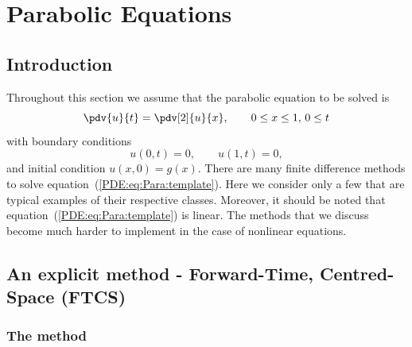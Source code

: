 \section{Parabolic Equations}

\subsection{Introduction}

Throughout this section we assume that the parabolic equation to be
solved is
%
\begin{equation}
  \pdv{u}{t} = \pdv[2]{u}{x} , \qquad 0 \le x \le 1, \, 0 \le t
  \label{PDE:eq:Para:template}
\end{equation}
%
with boundary conditions
%
\begin{equation*}
  u(0,t) = 0, \qquad u(1,t) = 0,
\end{equation*}
%
and initial condition $u(x,0) = g(x)$.  There are many finite
difference methods to solve equation~(\ref{PDE:eq:Para:template}).
Here we consider only a few that are typical examples of their
respective classes.  Moreover, it should be noted that
equation~(\ref{PDE:eq:Para:template}) is linear.  The methods that we
discuss become much harder to implement in the case of nonlinear
equations.

\subsection[Forward-Time, Centred-Space (FTCS)]{An explicit method - Forward-Time, Centred-Space (FTCS)}

\subsubsection{The method}

